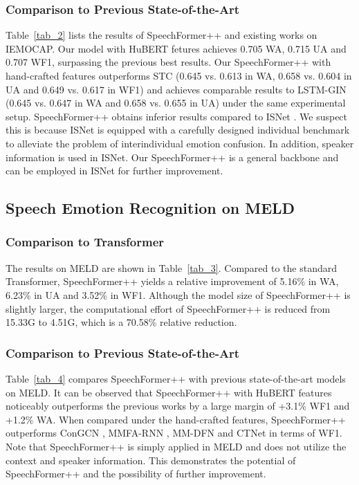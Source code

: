 \documentclass[lettersize,journal]{IEEEtran}
\begin{document}
\subsubsection{Comparison to Previous State-of-the-Art} Table~\ref{tab_2} lists the results of SpeechFormer++ and existing works on IEMOCAP. Our model with HuBERT fetures achieves 0.705 WA, 0.715 UA and 0.707 WF1, surpassing the previous best results. Our SpeechFormer++ with hand-crafted features outperforms STC \cite{stc} (0.645 vs. 0.613 in WA, 0.658 vs. 0.604 in UA and 0.649 vs. 0.617 in WF1) and achieves comparable results to LSTM-GIN \cite{LSTM-GIN} (0.645 vs. 0.647 in WA and 0.658 vs. 0.655 in UA) under the same experimental setup. SpeechFormer++ obtains inferior results compared to ISNet \cite{ISNet}. We suspect this is because ISNet is equipped with a carefully designed individual benchmark to alleviate the problem of interindividual emotion confusion. In addition, speaker information is used in ISNet. Our SpeechFormer++ is a general backbone and can be employed in ISNet for further improvement.

\subsection{Speech Emotion Recognition on MELD}
\subsubsection{Comparison to Transformer} The results on MELD are shown in Table~\ref{tab_3}. Compared to the standard Transformer, SpeechFormer++ yields a relative improvement of 5.16\% in WA, 6.23\% in UA and 3.52\% in WF1. Although the model size of SpeechFormer++ is slightly larger, the computational effort of SpeechFormer++ is reduced from 15.33G to 4.51G, which is a 70.58\% relative reduction.

\subsubsection{Comparison to Previous State-of-the-Art} Table~\ref{tab_4} compares SpeechFormer++ with previous state-of-the-art models on MELD. It can be observed that SpeechFormer++ with HuBERT features noticeably outperforms the previous works by a large margin of +3.1\% WF1 and +1.2\% WA. When compared under the hand-crafted features, SpeechFormer++ outperforms ConGCN \cite{ConGCN}, MMFA-RNN \cite{MMFA-RNN}, MM-DFN \cite{MM-DFN} and CTNet \cite{ctnet} in terms of WF1. Note that SpeechFormer++ is simply applied in MELD and does not utilize the context and speaker information. This demonstrates the potential of SpeechFormer++ and the possibility of further improvement.
\end{document}
